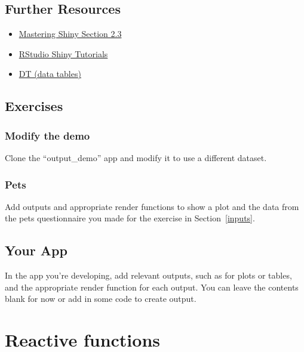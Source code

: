 \documentclass[
  oneside]{book}
\providecommand{\tightlist}{%
  \setlength{\itemsep}{0pt}\setlength{\parskip}{0pt}}
\begin{document}
\hypertarget{reosurces-outputs}{%
\section{Further Resources}\label{reosurces-outputs}}

\begin{itemize}
\tightlist
\item
  \href{https://mastering-shiny.org/basic-ui.html\#outputs}{Mastering Shiny Section 2.3}
\item
  \href{https://vimeo.com/rstudioinc/review/131218530/212d8a5a7a/\#t=10m41s}{RStudio Shiny Tutorials}
\item
  \href{https://rstudio.github.io/DT/}{DT (data tables)}
\end{itemize}

\hypertarget{exercises-outputs}{%
\section{Exercises}\label{exercises-outputs}}

\hypertarget{modify-the-demo}{%
\subsection{Modify the demo}\label{modify-the-demo}}

Clone the ``output\_demo'' app and modify it to use a different dataset.

\hypertarget{pets-1}{%
\subsection{Pets}\label{pets-1}}

Add outputs and appropriate render functions to show a plot and the data from the pets questionnaire you made for the exercise in Section~\ref{inputs}.

\hypertarget{your-app-outputs}{%
\section{Your App}\label{your-app-outputs}}

In the app you're developing, add relevant outputs, such as for plots or tables, and the appropriate render function for each output. You can leave the contents blank for now or add in some code to create output.

\hypertarget{reactives}{%
\chapter{Reactive functions}\label{reactives}}
\end{document}
